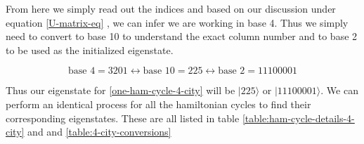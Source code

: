 \documentclass[msc,oneside]{ubcthesis}
\begin{document}
	From here we simply read out the indices and based on our discussion under equation \ref{U-matrix-eq} , we can infer we are working in base 4. Thus we simply need to convert to base 10 to understand the exact column number and to base 2 to be used as the initialized eigenstate.
	
	\begin{equation*}
		\text{base } 4 = 3201 \leftrightarrow \text{base } 10 = 225 \leftrightarrow  \text{base } 2 = 11100001
	\end{equation*}
	
	Thus our eigenstate for \ref{one-ham-cycle-4-city} will be  $|225\rangle$ or $|11100001\rangle$. We can perform an identical process for all the hamiltonian cycles to find their corresponding eigenstates. These are all listed in table \ref{table:ham-cycle-details-4-city} and and \ref{table:4-city-conversions}
	
\end{document}

